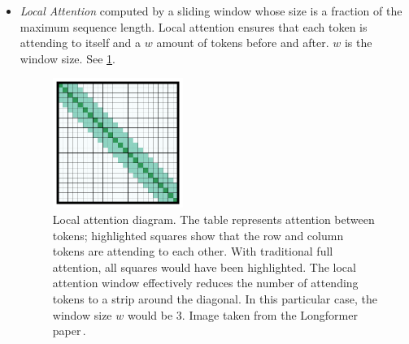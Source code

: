         \begin{itemize}
            \item \emph{Local Attention} computed by a sliding window whose size is a fraction of the maximum sequence length. Local attention ensures that each token is attending to itself and a $w$ amount of tokens before and after. $w$ is the window size. See \ref{fig:sliding-window-attention}.
            
            \begin{figure}[H]
              \centering
              \includegraphics[width=0.4\textwidth]{obrazky-figures/fig-attn-window.pdf}
              \caption{Local attention diagram. The table represents attention between tokens; highlighted squares show that the row and column tokens are attending to each other. With traditional full attention, all squares would have been highlighted. The local attention window effectively reduces the number of attending tokens to a strip around the diagonal. In this particular case, the window size $w$ would be 3. Image taken from the Longformer paper\,\cite{beltagy2020longformer}.}
              \label{fig:sliding-window-attention}
            \end{figure}
            

\end{itemize}

